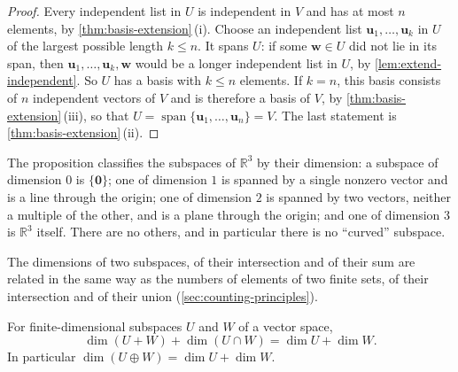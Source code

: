 \begin{proof}
Every independent list in $U$ is independent in $V$ and has at most $n$ elements, by \cref{thm:basis-extension}\,(i). Choose an independent list $\mathbf u_1,\ldots,\mathbf u_k$ in $U$ of the largest possible length $k\le n$. It spans $U$: if some $\mathbf w\in U$ did not lie in its span, then $\mathbf u_1,\ldots,\mathbf u_k,\mathbf w$ would be a longer independent list in $U$, by \cref{lem:extend-independent}. So $U$ has a basis with $k\le n$ elements. If $k=n$, this basis consists of $n$ independent vectors of $V$ and is therefore a basis of $V$, by \cref{thm:basis-extension}\,(iii), so that $U=\operatorname{span}\{\mathbf u_1,\ldots,\mathbf u_n\}=V$. The last statement is \cref{thm:basis-extension}\,(ii).
\end{proof}

The proposition classifies the subspaces of $\mathbb R^3$ by their dimension: a subspace of dimension $0$ is $\{\mathbf 0\}$; one of dimension $1$ is spanned by a single nonzero vector and is a line through the origin; one of dimension $2$ is spanned by two vectors, neither a multiple of the other, and is a plane through the origin; and one of dimension $3$ is $\mathbb R^3$ itself. There are no others, and in particular there is no ``curved'' subspace.

The dimensions of two subspaces, of their intersection and of their sum are related in the same way as the numbers of elements of two finite sets, of their intersection and of their union (\cref{sec:counting-principles}).

\begin{theorem}
\label{thm:dimension-formula}
For finite-dimensional subspaces $U$ and $W$ of a vector space,
\[
\dim(U+W)+\dim(U\cap W)=\dim U+\dim W .
\]
In particular $\dim(U\oplus W)=\dim U+\dim W$.
\end{theorem}

